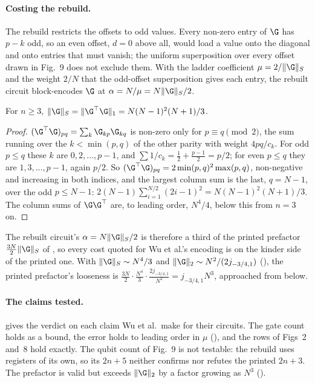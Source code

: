 \paragraph{Costing the rebuild.} The rebuild restricts the offsets to odd values. Every non-zero entry of $\G$ has $p-k$ odd, so an even offset, $d=0$ above all, would load a value onto the diagonal and onto entries that must vanish; the uniform superposition over every offset drawn in Fig.~9 does not exclude them. With the ladder coefficient $\mu=2/\|\G\|_S$ and the weight $2/N$ that the odd-offset superposition gives each entry, the rebuilt circuit block-encodes $\G$ at $\alpha=N/\mu=N\|\G\|_S/2$.

\begin{lemma}[Wu et al.'s norm of $\G$]
\label{lem:G-paper-norm}
For $n\ge3$, $\|\G\|_S=\|\G^{\top}\G\|_1=N(N-1)^2(N+1)/3$.
\end{lemma}
\begin{proof}
$(\G^{\top}\G)_{pq}=\sum_k\G_{kp}\G_{kq}$ is non-zero only for $p\equiv q\pmod 2$, the sum running over the $k<\min(p,q)$ of the other parity with weight $4pq/c_k$. For odd $p\le q$ these $k$ are $0,2,\dots,p-1$, and $\sum1/c_k=\tfrac12+\tfrac{p-1}{2}=p/2$; for even $p\le q$ they are $1,3,\dots,p-1$, again $p/2$. So $(\G^{\top}\G)_{pq}=2\min(p,q)^2\max(p,q)$, non-negative and increasing in both indices, and the largest column sum is the last, $q=N-1$, over the odd $p\le N-1$: $2(N-1)\sum_{i=1}^{N/2}(2i-1)^2=N(N-1)^2(N+1)/3$. The column sums of $\G\G^{\top}$ are, to leading order, $N^4/4$, below this from $n=3$ on.
\end{proof}

The rebuilt circuit's $\alpha=N\|\G\|_S/2$ is therefore a third of the printed prefactor $\tfrac{3N}{2}\|\G\|_S$ of , so every cost quoted for Wu et al.'s encoding is on the kinder side of the printed one. With $\|\G\|_S\sim N^4/3$ and $\|\G\|_2\sim N^2/(2j_{-3/4,1})$ (), the printed prefactor's looseness is $\tfrac{3N}{2}\cdot\tfrac{N^4}{3}\cdot\tfrac{2j_{-3/4,1}}{N^2}=j_{-3/4,1}N^3$, approached from below.

\paragraph{The claims tested.}  gives the verdict on each claim Wu et al.\ make for their circuits. The gate count holds as a bound, the error holds to leading order in $\mu$ (), and the rows of Figs~2 and~8 hold exactly. The qubit count of Fig.~9 is not testable: the rebuild uses registers of its own, so its $2n+5$ neither confirms nor refutes the printed $2n+3$. The prefactor is valid but exceeds $\|\G\|_2$ by a factor growing as $N^3$ ().

